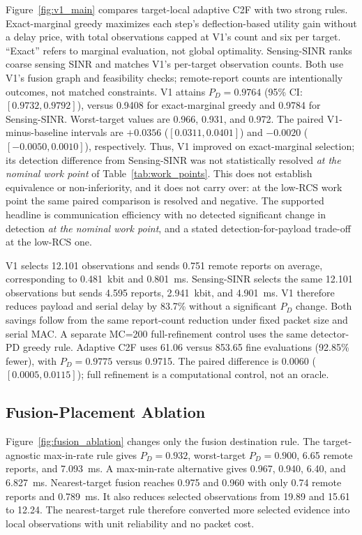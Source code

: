 Figure~\ref{fig:v1_main} compares target-local adaptive C2F with two strong
rules. Exact-marginal greedy maximizes each step's deflection-based utility
gain without a delay price, with total observations capped at V1's count and
six per target. ``Exact'' refers to marginal evaluation, not global optimality.
Sensing-SINR ranks coarse sensing SINR and matches V1's per-target observation
counts. Both use V1's fusion graph and feasibility checks; remote-report counts
are intentionally outcomes, not matched constraints. V1 attains
$P_D=0.9764$ (95\% CI: $[0.9732,0.9792]$), versus 0.9408 for exact-marginal
greedy and 0.9784 for Sensing-SINR. Worst-target values are 0.966, 0.931, and
0.972. The paired V1-minus-baseline intervals are $+0.0356$
($[0.0311,0.0401]$) and $-0.0020$ ($[-0.0050,0.0010]$), respectively.
Thus, V1 improved on exact-marginal selection; its detection difference from
Sensing-SINR was not statistically resolved \emph{at the nominal work point} of
Table~\ref{tab:work_points}. This does not establish
equivalence or non-inferiority, and it does not carry over: at the low-RCS work
point the same paired comparison is resolved and negative. The supported
headline is communication efficiency with no detected significant change in
detection \emph{at the nominal work point}, and a stated detection-for-payload
trade-off at the low-RCS one.

V1 selects 12.101 observations and
sends 0.751 remote reports on average, corresponding to 0.481~kbit and
0.801~ms. Sensing-SINR selects the same 12.101 observations but sends 4.595
reports, 2.941~kbit, and 4.901~ms. V1 therefore reduces payload and serial delay
by 83.7\% without a significant $P_D$ change. Both savings follow from the
same report-count reduction under fixed packet size and serial MAC. A separate
MC=200 full-refinement control uses the same detector-PD greedy rule.
Adaptive C2F uses 61.06 versus 853.65 fine evaluations (92.85\% fewer),
with $P_D=0.9775$ versus 0.9715. The paired difference is 0.0060
($[0.0005,0.0115]$); full refinement is a computational control, not an oracle.

\subsection{Fusion-Placement Ablation}

Figure~\ref{fig:fusion_ablation} changes only the fusion destination rule. The
target-agnostic max-in-rate rule gives $P_D=0.932$, worst-target $P_D=0.900$,
6.65 remote reports, and 7.093~ms. A max-min-rate alternative gives 0.967,
0.940, 6.40, and 6.827~ms. Nearest-target fusion reaches 0.975 and 0.960 with
only 0.74 remote reports and 0.789~ms. It also reduces selected observations
from 19.89 and 15.61 to 12.24. The nearest-target rule therefore converted more
selected evidence into local observations with unit reliability and no packet
cost.


